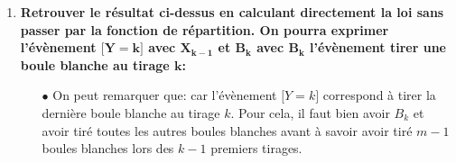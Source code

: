 \documentclass[a4paper, 11pt,reqno]{article}
\begin{document}
\begin{correction}
\begin{enumerate}
\begin{itemize}
\begin{itemize}
\begin{itemize}
								      $$P(\lbrack Y\leq k\rbrack)=P(\lbrack Y=k\rbrack)+P(\lbrack Y\leq k-1\rbrack)\Leftrightarrow
									      \fbox{$P(\lbrack Y=k\rbrack)=P(\lbrack Y\leq k\rbrack)-P(\lbrack Y\leq k-1\rbrack).$}$$
							      \item[$\circ$] Cette \'egalit\'e nous permet d'obtenir la loi de $Y$:\\
								      \noindent Si $k=m$ alors $\lbrack Y\leq k-1\rbrack=\emptyset$ et ainsi:  car $\binom{n-m}{0}=1$.\\
								      \noindent Si $k\in\intent{ m+1,n}$ alors $P(\lbrack Y=k\rbrack)=P(\lbrack Y\leq k\rbrack)-P(\lbrack Y\leq k-1\rbrack)=
									      \ddp\frac{ \binom{n-m}{k-m} }{  \binom{n}{k}  }-\ddp\frac{ \binom{n-m}{k-1-m} }{  \binom{n}{k-1}}$. Si on \'ecrit les coefficients binomiaux sous forme de factorielle et que l'on fait quelques calculs en factorisant, on obtient que:
								      $$\forall k\in\intent{ m+1,n},\ P(\lbrack Y=k\rbrack)=m\ddp\frac{(n-m)! (k-1)!}{n!(k-m)!}.$$
								      On peut d'ailleurs remarquer que cette formule est aussi vraie pour $k=m$ car $m\ddp\frac{(n-m)! (k-1)!}{n!(k-m)!}=m\ddp\frac{(n-m)! (m-1)!}{n!(m-m)!}=\ddp\frac{(n-m)! m!}{n!}=\ddp\frac{1}{\binom{n}{m}}$. On obtient donc au final que:
								      $$\fbox{$\forall k\in Y(\Omega),\ P(\lbrack Y=k\rbrack)=m\ddp\frac{(n-m)! (k-1)!}{n!(k-m)!}.$}$$
						      \end{itemize}
				      \end{itemize}
		      \end{itemize}
		\item \textbf{ Retrouver le r\'esultat ci-dessus en calculant directement la loi sans passer par la fonction de r\'epartition. On pourra exprimer l'\'ev\`{e}nement $\mathbf{\lbrack Y=k\rbrack}$ avec $\mathbf{X_{k-1}}$ et $\mathbf{B_k}$ avec $\mathbf{B_k}$ l'\'ev\`{e}nement \og tirer une boule blanche au tirage $\mathbf{k}$\fg:}
		      \begin{itemize}
			      \item[$\bullet$] On peut remarquer que:  car l'\'ev\`{e}nement $\lbrack Y=k\rbrack$ correspond \`{a} tirer la derni\`{e}re boule blanche au tirage $k$. Pour cela, il faut bien avoir $B_k$ et avoir tir\'e toutes les autres boules blanches avant \`{a} savoir avoir tir\'e $m-1$ boules blanches lors des $k-1$ premiers tirages.

\end{itemize}
\end{enumerate}
\end{correction}
\end{document}
